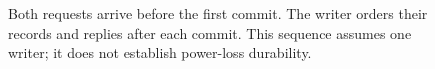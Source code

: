 \begin{figure}[H]
\centering
{}
\caption{Both requests arrive before the first commit. The writer orders their records and replies after each commit. This sequence assumes one writer; it does not establish power-loss durability.}
\label{fig:swk-single-writer}
\end{figure}
